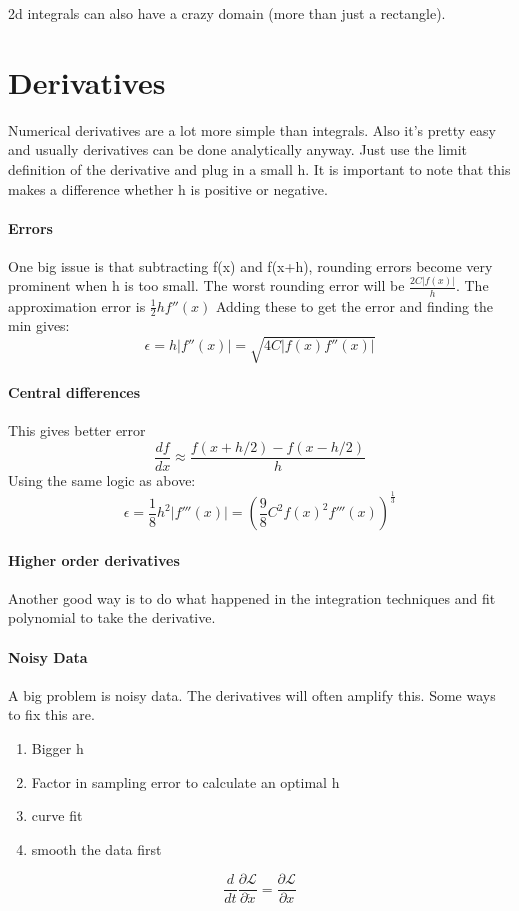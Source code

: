\documentclass{report}
\begin{document}
2d integrals can also have a crazy domain (more than just a rectangle).
\section {Derivatives}
Numerical derivatives are a lot more simple than integrals. Also it's pretty easy and usually derivatives can be done analytically anyway.
Just use the limit definition of the derivative and plug in a small h. It is important to note that this makes a difference whether h is positive or negative.
\paragraph{Errors}
One big issue is that subtracting f(x) and f(x+h), rounding errors become very prominent when h is too small. The worst rounding error will be $\frac{2C|f(x)|}h$. The approximation error is $\frac12hf''(x)$
Adding these to get the error and finding the min gives:
\[\epsilon=h|f''(x)|=\sqrt{4C|f(x)f''(x)|}\]
\paragraph{Central differences}
This gives better error
\[\frac{df}{dx}\approx\frac{f(x+h/2)-f(x-h/2)}{h}\]
Using the same logic as above:
\[\epsilon =\frac18h^2|f'''(x)|=(\frac98C^2f(x)^2f'''(x))^{\frac13}\]
\paragraph{Higher order derivatives}
Another good way is to do what happened in the integration techniques and fit polynomial to take the derivative.
\paragraph{Noisy Data}
A big problem is noisy data. The derivatives will often amplify this. Some ways to fix this are.
\begin{enumerate}
	\item Bigger h
	\item Factor in sampling error  to calculate an optimal h
	\item curve fit
	\item smooth the data first
\end{enumerate}

\[
\frac{d}{dt} \frac{\partial\mathscr{L}}{\partial\dot x}=\frac{\partial\mathscr{L}}{\partial x}
\]
\end{document}
